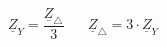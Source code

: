 \documentclass[10pt,landscape]{article}
\begin{document}
\begin{multicols}{3}
\begin{equation*}
	\underline{Z}_Y = \frac{\underline{Z}_\triangle}{3} \hspace{20pt} \underline{Z}_\triangle = 3 \cdot \underline{Z}_Y
\end{equation*}



\end{multicols}
\end{document}
